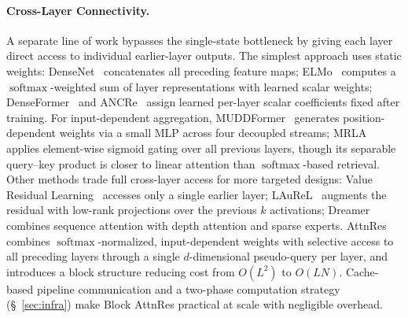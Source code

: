 \paragraph{Cross-Layer Connectivity.}
A separate line of work bypasses the single-state bottleneck by giving each layer direct access to individual earlier-layer outputs.
The simplest approach uses static weights: DenseNet~\citep{huang2018densenet} concatenates all preceding feature maps; ELMo~\citep{peters-etal-2018-deep} computes a $\operatorname{softmax}$-weighted sum of layer representations with learned scalar weights; DenseFormer~\citep{pagliardini2024denseformer} and ANCRe~\citep{zhang2026ancre} assign learned per-layer scalar coefficients fixed after training.
For input-dependent aggregation, MUDDFormer~\citep{xiao2025muddformer} generates position-dependent weights via a small MLP across four decoupled streams;
MRLA~\citep{fang2023cross} applies element-wise sigmoid gating over all previous layers, though its separable query--key product is closer to linear attention than $\operatorname{softmax}$-based retrieval.
Other methods trade full cross-layer access for more targeted designs:
Value Residual Learning~\citep{zhou-etal-2025-value} accesses only a single earlier layer;
LAuReL~\citep{menghani2025laurel} augments the residual with low-rank projections over the previous $k$ activations;
Dreamer~\citep{knupp2026depthrecurrent} combines sequence attention with depth attention and sparse experts.
AttnRes combines $\operatorname{softmax}$-normalized, input-dependent weights with selective access to all preceding layers through a single $d$-dimensional pseudo-query per layer, and introduces a block structure reducing cost from $O(L^2)$ to $O(LN)$.
Cache-based pipeline communication and a two-phase computation strategy (\S~\ref{sec:infra}) make Block AttnRes practical at scale with negligible overhead.